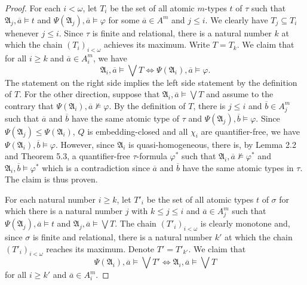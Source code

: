 \documentclass{ndjflart}
\theoremstyle{plain}
\theoremstyle{definition}
\numberwithin{equation}{section}
\begin{document}
\begin{proof}
For each $i < \omega$, let $T_i$ be the set of all atomic
$m$-types $t$ of $\tau$
such that $\mathfrak{A}_j, \overline{a} \vDash t$
and $\Psi(\mathfrak{A}_j), \overline{a} \vDash \varphi$
for some $\overline{a} \in A^m$ and $j \leq i$.
We clearly have $T_j \subseteq T_i$ whenever $j \leq i$.
Since $\tau$ is finite and relational, there is a natural number $k$
at which the chain $(T_i)_{i < \omega}$ achieves its maximum.
Write $T = T_k$.
We claim that for all $i \geq k$ and $\overline{a} \in A_i^m$, we have
\begin{equation}\label{eq_0}
\mathfrak{A}_i, \overline{a} \vDash \bigvee T
\Leftrightarrow
\Psi(\mathfrak{A}_i), \overline{a} \vDash \varphi.
\end{equation}
The statement on the right side implies the left side statement by the
definition of $T$.
For the other direction, suppose that
$\mathfrak{A}_i, \overline{a} \vDash \bigvee T$
and assume to the contrary that
$\Psi(\mathfrak{A}_i), \overline{a} \nvDash \varphi$.
By the definition of $T$, there is $j \leq i$ and $\overline{b} \in A_j^m$
such that $\overline{a}$ and $\overline{b}$ have the same atomic type of $\tau$
and $\Psi(\mathfrak{A}_j), \overline{b} \vDash \varphi$.
Since $\Psi(\mathfrak{A}_j) \leq \Psi(\mathfrak{A}_i)$, $Q$ is embedding-closed
and all $\chi_i$ are quantifier-free, we have
$\Psi(\mathfrak{A}_i), \overline{b} \vDash \varphi$.
However, since $\mathfrak{A}_i$ is quasi-homogeneous,
there is, by Lemma 2.2 and Theorem 5.3, a quantifier-free $\tau$-formula
$\varphi^*$ such that
$\mathfrak{A}_i, \overline{a} \nvDash \varphi^*$
and $\mathfrak{A}_i, \overline{b} \vDash \varphi^*$
which is a contradiction since $\overline{a}$ and $\overline{b}$ have the
same atomic types in $\tau$.
The claim is thus proven.

For each natural number $i \geq k$,
let $T'_i$ be the set of all atomic types $t$ of $\sigma$
for which there is a natural number $j$ with
$k \leq j \leq i$ and $\overline{a} \in A^m_j$ such that
$\Psi(\mathfrak{A}_j), \overline{a} \vDash t$ and
$\mathfrak{A}_j, \overline{a} \vDash \bigvee T$.
The chain $(T'_i)_{i < \omega}$ is clearly monotone and, since $\sigma$ is
finite and relational, there is a natural
number $k'$ at which the chain $(T'_i)_{i < \omega}$ reaches
its maximum.
Denote $T' = T'_{k'}$.
We claim that
\begin{equation}\label{eq_1}
\Psi(\mathfrak{A}_i), \overline{a} \vDash \bigvee T' \Leftrightarrow
\mathfrak{A}_i, \overline{a} \vDash \bigvee T
\end{equation}
for all $i \geq k'$ and $\overline{a} \in A_i^m$.


\end{proof}
\end{document}
